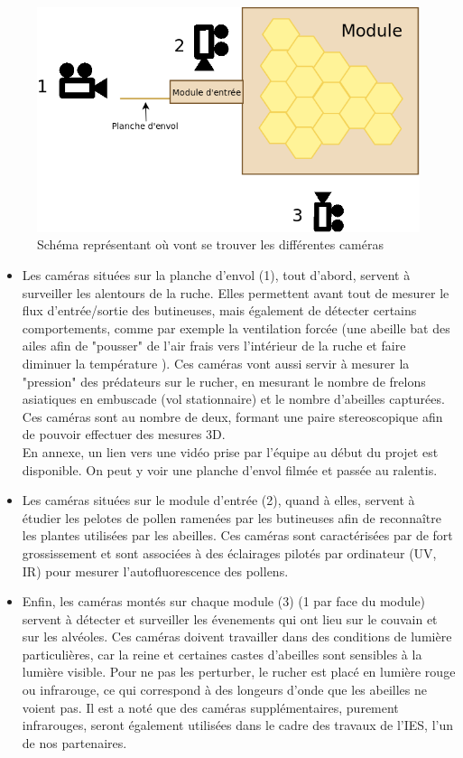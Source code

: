 \documentclass[11pt,french,a4paper]{report}
\begin{document}
\begin{figure}[!h]
\centering
\includegraphics[scale=0.3]{../images/dia/schema_camera.png}
    \caption{Schéma représentant où vont se trouver les différentes caméras}
    \label{sch_cam}
\end{figure}
\begin{itemize}
  \item Les caméras situées sur la planche d'envol (1), tout d'abord, servent à surveiller 
  les alentours de la ruche. Elles permettent avant tout de
  mesurer le flux d'entrée/sortie des butineuses, mais également de détecter
  certains comportements, comme par exemple la ventilation forcée (une abeille
  bat des ailes afin de "pousser" de l'air frais vers l'intérieur de la ruche et faire
  diminuer la température ). Ces caméras vont aussi servir à mesurer la
  "pression" des prédateurs sur le rucher, en mesurant le nombre de frelons
  asiatiques en embuscade (vol stationnaire) et le nombre d'abeilles
  capturées. Ces caméras sont au nombre de deux, formant une paire
  stereoscopique afin de pouvoir effectuer des mesures 3D. \\
  En annexe, un lien vers une vidéo prise par l'équipe au début du projet est disponible. 
  On peut y voir une planche d'envol filmée et passée au ralentis. \\ 
 
  \item Les caméras situées sur le module d'entrée (2), quand à elles, servent à étudier
  les pelotes de pollen ramenées par les butineuses afin de reconnaître les
  plantes utilisées par les abeilles. Ces caméras sont caractérisées par de
  fort grossissement et sont associées à des éclairages pilotés par ordinateur
  (UV, IR) pour mesurer l'autofluorescence des pollens.

  \item Enfin, les caméras montés sur chaque module (3) (1 par face du module) servent
  à détecter et surveiller les évenements qui ont lieu sur le couvain et sur
  les alvéoles. Ces caméras doivent travailler dans des conditions de lumière
  particulières, car la reine et certaines castes d'abeilles sont sensibles à
  la lumière visible. Pour ne pas les perturber, le rucher est placé en
  lumière rouge ou infrarouge, ce qui correspond à des longeurs d'onde que les
  abeilles ne voient pas. Il est a noté que des caméras supplémentaires,
  purement infrarouges, seront également utilisées dans le cadre des travaux de
  l'IES, l'un de nos partenaires.
\end{itemize}
\end{document}
